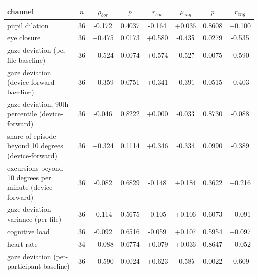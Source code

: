 \begin{tabular}{lccccccc}
\hline
channel & $n$ & $\rho_{bor}$ & $p$ & $r_{bor}$ & $\rho_{eng}$ & $p$ & $r_{eng}$ \\
\hline
pupil dilation & 36 & -0.172 & 0.4037 & -0.164 & +0.036 & 0.8608 & +0.100 \\
eye closure & 36 & +0.475 & 0.0173 & +0.580 & -0.435 & 0.0279 & -0.535 \\
gaze deviation (per-file baseline) & 36 & +0.524 & 0.0074 & +0.574 & -0.527 & 0.0075 & -0.590 \\
gaze deviation (device-forward baseline) & 36 & +0.359 & 0.0751 & +0.341 & -0.391 & 0.0515 & -0.403 \\
gaze deviation, 90th percentile (device-forward) & 36 & -0.046 & 0.8222 & +0.000 & -0.033 & 0.8730 & -0.088 \\
share of episode beyond 10 degrees (device-forward) & 36 & +0.324 & 0.1114 & +0.346 & -0.334 & 0.0990 & -0.389 \\
excursions beyond 10 degrees per minute (device-forward) & 36 & -0.082 & 0.6829 & -0.148 & +0.184 & 0.3622 & +0.216 \\
gaze deviation variance (per-file) & 36 & -0.114 & 0.5675 & -0.105 & +0.106 & 0.6073 & +0.091 \\
cognitive load & 36 & -0.092 & 0.6516 & -0.059 & +0.107 & 0.5954 & +0.097 \\
heart rate & 34 & +0.088 & 0.6774 & +0.079 & +0.036 & 0.8647 & +0.052 \\
gaze deviation (per-participant baseline) & 36 & +0.590 & 0.0024 & +0.623 & -0.585 & 0.0022 & -0.609 \\
\hline
\end{tabular}
